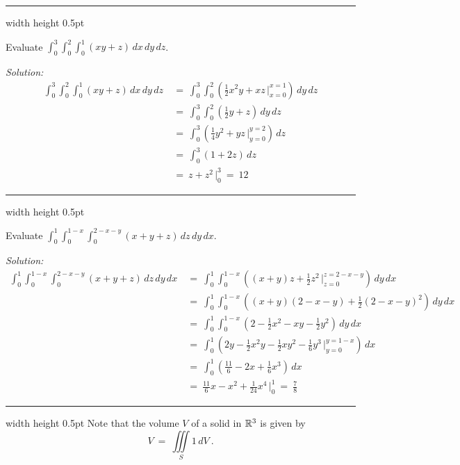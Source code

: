 \vspace{3mm}
\hrule width \textwidth height 0.5pt
\begin{exmp}
 Evaluate $\displaystyle\int_0^3 \displaystyle\int_0^2 \displaystyle\int_0^1 (xy+z) \,dx\,dy\,dz$.\vspace{1mm}
 \par\noindent \emph{Solution:}
 \begin{align*}
  \int_0^3 \int_0^2 \int_0^1 (xy+z) \,dx\,dy\,dz ~&=~
   \int_0^3 \int_0^2 \left( \tfrac{1}{2}x^2 y + xz \, \Big|_{x=0}^{x=1} \right) \,dy\,dz\\
   &=~ \int_0^3 \int_0^2 \left( \tfrac{1}{2}y + z \right) \,dy\,dz\\
   &=~ \int_0^3 \left( \tfrac{1}{4}y^2 + yz \,\Big|_{y=0}^{y=2} \right) \,dz\\
   &=~ \int_0^3 (1+2z) \,dz\\
   &=~ z + z^2 \,\Big|_0^3 ~=~ 12
 \end{align*}
\end{exmp}
\hrule width \textwidth height 0.5pt
\begin{exmp}
 Evaluate $\displaystyle\int_0^1 \displaystyle\int_0^{1-x} \displaystyle\int_0^{2-x-y} (x+y+z)\,dz\,dy\,dx$.\vspace{1mm}
 \par\noindent \emph{Solution:}
 \begin{align*}
  \int_0^1 \int_0^{1-x} \int_0^{2-x-y} (x+y+z) \,dz\,dy\,dx ~&=~
   \int_0^1 \int_0^{1-x} \left( (x+y)z+ \tfrac{1}{2}z^2 \, \Big|_{z=0}^{z=2-x-y} \right) \,dy\,dx\\
   &=~ \int_0^1 \int_0^{1-x} \left( (x+y)(2-x-y) + \tfrac{1}{2}(2-x-y)^2 \right) \,dy\,dx\\
   &=~ \int_0^1 \int_0^{1-x} \left( 2 - \tfrac{1}{2}x^2 - xy - \tfrac{1}{2}y^2 \right) \,dy\,dx\\
   &=~ \int_0^1 \left( 2y-\tfrac{1}{2}x^2 y - \tfrac{1}{2}xy^2 - \tfrac{1}{6}y^3 \,\Big|_{y=0}^{y=1-x} \right) \,dx\\
   &=~ \int_0^1 \left( \tfrac{11}{6} - 2x + \tfrac{1}{6}x^3 \right) \,dx\\
   &=~ \tfrac{11}{6}x - x^2 + \tfrac{1}{24}x^4 \,\Big|_0^1 ~=~ \tfrac{7}{8}
 \end{align*}
\end{exmp}
\hrule width \textwidth height 0.5pt
\newpage
Note that the volume $V$ of a solid in $\mathbb{R}^{3}$ is given by
\begin{equation}
 V ~=~ \iiint\limits_{S} 1\,dV ~.
\end{equation}
